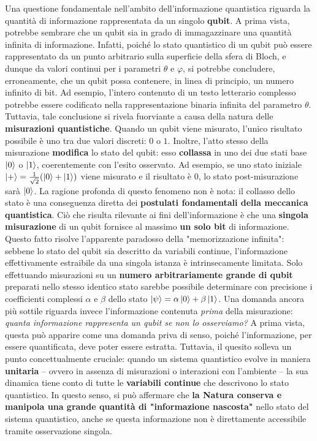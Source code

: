 \documentclass[a4paper,12pt]{report}
\theoremstyle{plain}
\begin{document}
\noindent Una questione fondamentale nell'ambito dell'informazione quantistica riguarda la quantità di informazione rappresentata da un singolo \textbf{qubit}. A prima vista, potrebbe sembrare che un qubit sia in grado di immagazzinare una quantità infinita di informazione. Infatti, poiché lo stato quantistico di un qubit può essere rappresentato da un punto arbitrario sulla superficie della sfera di Bloch, e dunque da valori continui per i parametri $\theta$ e $\varphi$, si potrebbe concludere, erroneamente, che un qubit possa contenere, in linea di principio, un numero infinito di bit. Ad esempio, l'intero contenuto di un testo letterario complesso potrebbe essere codificato nella rappresentazione binaria infinita del parametro $\theta$.
Tuttavia, tale conclusione si rivela fuorviante a causa della natura delle \textbf{misurazioni quantistiche}. Quando un qubit viene misurato, l'unico risultato possibile è uno tra due valori discreti: $0$ o $1$. Inoltre, l'atto stesso della misurazione \textbf{modifica} lo stato del qubit: esso \textbf{collassa} in uno dei due stati base $\ket{0}$ o $\ket{1}$, coerentemente con l'esito osservato. Ad esempio, se uno stato iniziale $\ket{+} = \frac{1}{\sqrt{2}}(\ket{0} + \ket{1})$ viene misurato e il risultato è $0$, lo stato post-misurazione sarà $\ket{0}$. La ragione profonda di questo fenomeno non è nota: il collasso dello stato è una conseguenza diretta dei \textbf{postulati fondamentali della meccanica quantistica}.
Ciò che risulta rilevante ai fini dell'informazione è che una \textbf{singola misurazione} di un qubit fornisce al massimo \textbf{un solo bit} di informazione. Questo fatto risolve l'apparente paradosso della "memorizzazione infinita": sebbene lo stato del qubit sia descritto da variabili continue, l'informazione effettivamente estraibile da una singola istanza è intrinsecamente limitata. Solo effettuando misurazioni su un \textbf{numero arbitrariamente grande di qubit} preparati nello stesso identico stato sarebbe possibile determinare con precisione i coefficienti complessi $\alpha$ e $\beta$ dello stato $\ket{\psi} = \alpha\ket{0} + \beta\ket{1}$.
Una domanda ancora più sottile riguarda invece l'informazione contenuta \textit{prima} della misurazione: \textit{quanta informazione rappresenta un qubit se non lo osserviamo?} A prima vista, questa può apparire come una domanda priva di senso, poiché l'informazione, per essere quantificata, deve poter essere estratta. Tuttavia, il quesito solleva un punto concettualmente cruciale: quando un sistema quantistico evolve in maniera \textbf{unitaria} -- ovvero in assenza di misurazioni o interazioni con l'ambiente -- la sua dinamica tiene conto di tutte le \textbf{variabili continue} che descrivono lo stato quantistico. In questo senso, si può affermare che \textbf{la Natura conserva e manipola una grande quantità di "informazione nascosta"} nello stato del sistema quantistico, anche se questa informazione non è direttamente accessibile tramite osservazione singola.
\end{document}

